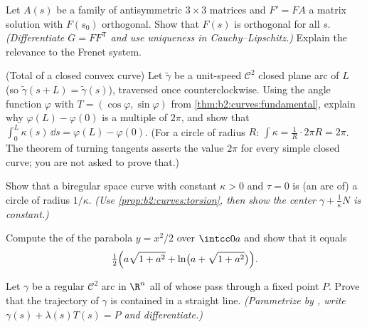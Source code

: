 \begin{exercise}[$\star\star\star$]\label{exo:b2:curves:7}
Let $A(s)$ be a  family of antisymmetric $3 \times 3$
matrices and $F' = F A$ a matrix solution with $F(s_0)$
orthogonal. Show that $F(s)$ is orthogonal for all $s$.
\emph{(Differentiate $G = F F^{\mathsf T}$ and use uniqueness in
Cauchy--Lipschitz.)} Explain the relevance to the Frenet system.
\end{exercise}

\begin{exercise}[$\star\star\star$]\label{exo:b2:curves:8}
(Total  of a closed convex curve) Let $\tilde\gamma$ be a
unit-speed $\mathcal{C}^2$ closed plane arc of  $L$
(so $\tilde\gamma(s + L) = \tilde\gamma(s)$), traversed once
counterclockwise. Using the angle function $\varphi$ with $T =
(\cos\varphi, \sin\varphi)$ from
\cref{thm:b2:curves:fundamental}, explain why $\varphi(L) -
\varphi(0)$ is a multiple of $2\pi$, and show that
$\int_0^L \kappa(s)\,\dd s = \varphi(L) - \varphi(0)$. (For a
circle of radius $R$: $\int \kappa = \frac1R \cdot 2\pi R = 2\pi$.
The theorem of turning tangents asserts the value $2\pi$ for
every simple closed curve; you are not asked to prove that.)
\end{exercise}

\begin{exercise}[$\star\star\star$]\label{exo:b2:curves:9}
Show that a biregular space curve with constant $\kappa > 0$ and
$\tau = 0$ is (an arc of) a circle of radius $1/\kappa$.
\emph{(Use \cref{prop:b2:curves:torsion}, then show the center
$\gamma + \frac1\kappa N$ is constant.)}
\end{exercise}

\begin{exercise}[$\star$]\label{exo:b2:curves:10}
Compute the  of the parabola $y = x^2/2$ over
$\intcc0a$ and show that it equals
\[
\tfrac12\Bigl(a\sqrt{1 + a^2} + \ln\bigl(a + \sqrt{1 +
a^2}\bigr)\Bigr).
\]
\end{exercise}

\begin{exercise}[$\star\star$]\label{exo:b2:curves:11}
Let $\gamma$ be a regular $\mathcal C^2$ arc in $\R^n$ all of
whose  pass through a fixed point $P$. Prove that
the trajectory of $\gamma$ is contained in a straight line.
\emph{(Parametrize by , write $\gamma(s) +
\lambda(s)T(s) = P$ and differentiate.)}
\end{exercise}

